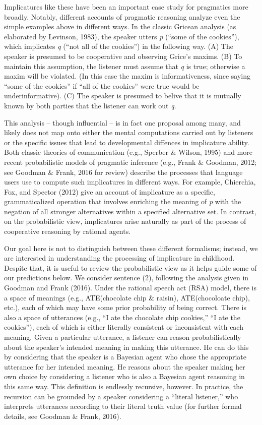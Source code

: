 \documentclass[man]{apa6}
\theoremstyle{definition}
\theoremstyle{definition}
\theoremstyle{definition}
\theoremstyle{remark}
\begin{document}
Implicatures like these have been an important case study for pragmatics
more broadly. Notably, different accounts of pragmatic reasoning analyze
even the simple examples above in different ways. In the classic Gricean
analysis (as elaborated by Levinson, 1983), the speaker utters \emph{p}
(\enquote{some of the cookies}), which implicates \emph{q} (\enquote{not
all of the cookies}) in the following way. (A) The speaker is presumed
to be cooperative and observing Grice's maxims. (B) To maintain this
assumption, the listener must assume that \emph{q} is true; otherwise a
maxim will be violated. (In this case the maxim is informativeness,
since saying \enquote{some of the cookies} if \enquote{all of the
cookies} were true would be underinformative). (C) The speaker is
presumed to belive that it is mutually known by both parties that the
listener can work out \emph{q}.

This analysis -- though influential -- is in fact one proposal among
many, and likely does not map onto either the mental computations
carried out by listeners or the specific issues that lead to
developmental diffences in implicature ability. Both classic theories of
communication (e.g., Sperber \& Wilson, 1995) and more recent
probabilistic models of pragmatic inference (e.g., Frank \& Goodman,
2012; see Goodman \& Frank, 2016 for review) describe the processes that
language users use to compute such implicatures in different ways. For
example, Chierchia, Fox, and Spector (2012) give an account of
implicature as a specific, grammaticalized operation that involves
enriching the meaning of \emph{p} with the negation of all stronger
alternatives within a specified alternative set. In contrast, on the
probabilistic view, implicatures arise naturally as part of the process
of cooperative reasoning by rational agents.

Our goal here is not to distinguish between these different formalisms;
instead, we are interested in understanding the processing of
implicature in childhood. Despite that, it is useful to review the
probabilistic view as it helps guide some of our predictions below. We
consider sentence (2), following the analysis given in Goodman and Frank
(2016). Under the rational speech act (RSA) model, there is a space of
meanings (e.g., ATE(chocolate chip \& raisin), ATE(chocoloate chip),
etc.), each of which may have some prior probability of being correct.
There is also a space of utterances (e.g., \enquote{I ate the chocolate
chip cookies,} \enquote{I ate the cookies}), each of which is either
literally consistent or inconsistent with each meaning. Given a
particular utterance, a listener can reason probabilistically about the
speaker's intended meaning in making this utterance. He can do this by
considering that the speaker is a Bayesian agent who chose the
appropriate utterance for her intended meaning. He reasons about the
speaker making her own choice by considering a listener who is also a
Bayesian agent reasoning in this same way. This definition is endlessly
recursive, however. In practice, the recursion can be grounded by a
speaker considering a \enquote{literal listener,} who interprets
utterances according to their literal truth value (for further formal
details, see Goodman \& Frank, 2016).
\end{document}
